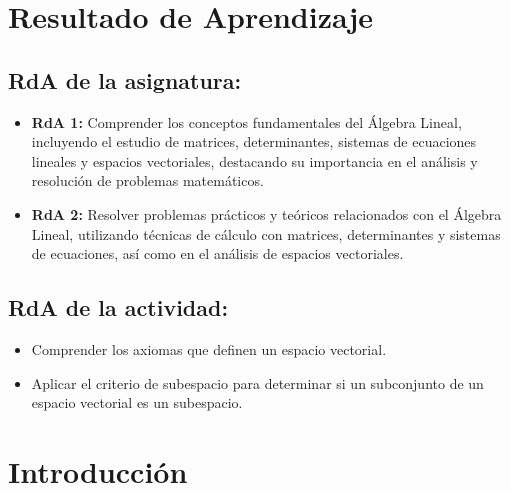 \documentclass[a4,11pt]{aleph-notas}
\begin{document}
\encabezado 

\section*{Resultado de Aprendizaje}

\subsection*{RdA de la asignatura:}
\begin{itemize}[leftmargin=*]
    \item \textbf{RdA 1:} Comprender los conceptos fundamentales del Álgebra Lineal, incluyendo el estudio de matrices, determinantes, sistemas de ecuaciones lineales y espacios vectoriales, destacando su importancia en el análisis y resolución de problemas matemáticos.
    \item \textbf{RdA 2:} Resolver problemas prácticos y teóricos relacionados con el Álgebra Lineal, utilizando técnicas de cálculo con matrices, determinantes y sistemas de ecuaciones, así como en el análisis de espacios vectoriales.    
\end{itemize}


\subsection*{RdA de la actividad:}
\begin{itemize}[leftmargin=*]
    \item Comprender los axiomas que definen un espacio vectorial.
    \item Aplicar el criterio de subespacio para determinar si un subconjunto de un espacio vectorial es un subespacio. 
\end{itemize}

\section*{Introducción}

\end{document}
